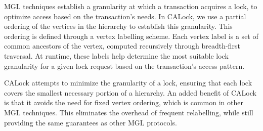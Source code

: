 MGL techniques establish a granularity at which a transaction acquires a lock, to optimize access based on the transaction's needs. In CALock, we use a partial ordering of the vertices in the hierarchy to establish this granularity. This ordering is defined through a vertex labelling scheme.  Each vertex label is a set of common ancestors of the vertex, computed recursively through breadth-first traversal.
At runtime, these labels help determine the most suitable lock granularity for a given lock request based on the transaction’s access pattern.

CALock attempts to minimize the granularity of a lock, ensuring that each lock covers the smallest necessary portion of a hierarchy. 
An added benefit of CALock is that it avoids the need for fixed vertex ordering, which is common in other MGL techniques. This eliminates the overhead of frequent relabelling, while still providing the same guarantees as other MGL protocols.










